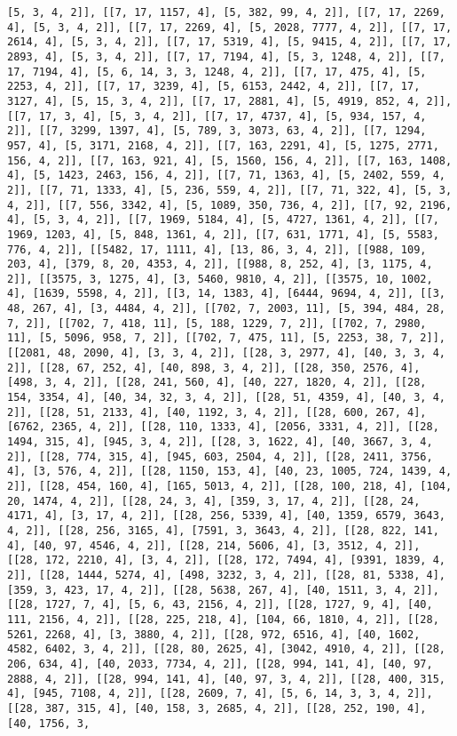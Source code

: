 \documentclass[12pt,fleqn]{article}\usepackage{../../common}
\begin{document}
\begin{verbatim}
[5, 3, 4, 2]], [[7, 17, 1157, 4], [5, 382, 99, 4, 2]], [[7, 17, 2269, 4], [5, 3, 4, 2]], [[7, 17, 2269, 4], [5, 2028, 7777, 4, 2]], [[7, 17, 2614, 4], [5, 3, 4, 2]], [[7, 17, 5319, 4], [5, 9415, 4, 2]], [[7, 17, 2893, 4], [5, 3, 4, 2]], [[7, 17, 7194, 4], [5, 3, 1248, 4, 2]], [[7, 17, 7194, 4], [5, 6, 14, 3, 3, 1248, 4, 2]], [[7, 17, 475, 4], [5, 2253, 4, 2]], [[7, 17, 3239, 4], [5, 6153, 2442, 4, 2]], [[7, 17, 3127, 4], [5, 15, 3, 4, 2]], [[7, 17, 2881, 4], [5, 4919, 852, 4, 2]], [[7, 17, 3, 4], [5, 3, 4, 2]], [[7, 17, 4737, 4], [5, 934, 157, 4, 2]], [[7, 3299, 1397, 4], [5, 789, 3, 3073, 63, 4, 2]], [[7, 1294, 957, 4], [5, 3171, 2168, 4, 2]], [[7, 163, 2291, 4], [5, 1275, 2771, 156, 4, 2]], [[7, 163, 921, 4], [5, 1560, 156, 4, 2]], [[7, 163, 1408, 4], [5, 1423, 2463, 156, 4, 2]], [[7, 71, 1363, 4], [5, 2402, 559, 4, 2]], [[7, 71, 1333, 4], [5, 236, 559, 4, 2]], [[7, 71, 322, 4], [5, 3, 4, 2]], [[7, 556, 3342, 4], [5, 1089, 350, 736, 4, 2]], [[7, 92, 2196, 4], [5, 3, 4, 2]], [[7, 1969, 5184, 4], [5, 4727, 1361, 4, 2]], [[7, 1969, 1203, 4], [5, 848, 1361, 4, 2]], [[7, 631, 1771, 4], [5, 5583, 776, 4, 2]], [[5482, 17, 1111, 4], [13, 86, 3, 4, 2]], [[988, 109, 203, 4], [379, 8, 20, 4353, 4, 2]], [[988, 8, 252, 4], [3, 1175, 4, 2]], [[3575, 3, 1275, 4], [3, 5460, 9810, 4, 2]], [[3575, 10, 1002, 4], [1639, 5598, 4, 2]], [[3, 14, 1383, 4], [6444, 9694, 4, 2]], [[3, 48, 267, 4], [3, 4484, 4, 2]], [[702, 7, 2003, 11], [5, 394, 484, 28, 7, 2]], [[702, 7, 418, 11], [5, 188, 1229, 7, 2]], [[702, 7, 2980, 11], [5, 5096, 958, 7, 2]], [[702, 7, 475, 11], [5, 2253, 38, 7, 2]], [[2081, 48, 2090, 4], [3, 3, 4, 2]], [[28, 3, 2977, 4], [40, 3, 3, 4, 2]], [[28, 67, 252, 4], [40, 898, 3, 4, 2]], [[28, 350, 2576, 4], [498, 3, 4, 2]], [[28, 241, 560, 4], [40, 227, 1820, 4, 2]], [[28, 154, 3354, 4], [40, 34, 32, 3, 4, 2]], [[28, 51, 4359, 4], [40, 3, 4, 2]], [[28, 51, 2133, 4], [40, 1192, 3, 4, 2]], [[28, 600, 267, 4], [6762, 2365, 4, 2]], [[28, 110, 1333, 4], [2056, 3331, 4, 2]], [[28, 1494, 315, 4], [945, 3, 4, 2]], [[28, 3, 1622, 4], [40, 3667, 3, 4, 2]], [[28, 774, 315, 4], [945, 603, 2504, 4, 2]], [[28, 2411, 3756, 4], [3, 576, 4, 2]], [[28, 1150, 153, 4], [40, 23, 1005, 724, 1439, 4, 2]], [[28, 454, 160, 4], [165, 5013, 4, 2]], [[28, 100, 218, 4], [104, 20, 1474, 4, 2]], [[28, 24, 3, 4], [359, 3, 17, 4, 2]], [[28, 24, 4171, 4], [3, 17, 4, 2]], [[28, 256, 5339, 4], [40, 1359, 6579, 3643, 4, 2]], [[28, 256, 3165, 4], [7591, 3, 3643, 4, 2]], [[28, 822, 141, 4], [40, 97, 4546, 4, 2]], [[28, 214, 5606, 4], [3, 3512, 4, 2]], [[28, 172, 2210, 4], [3, 4, 2]], [[28, 172, 7494, 4], [9391, 1839, 4, 2]], [[28, 1444, 5274, 4], [498, 3232, 3, 4, 2]], [[28, 81, 5338, 4], [359, 3, 423, 17, 4, 2]], [[28, 5638, 267, 4], [40, 1511, 3, 4, 2]], [[28, 1727, 7, 4], [5, 6, 43, 2156, 4, 2]], [[28, 1727, 9, 4], [40, 111, 2156, 4, 2]], [[28, 225, 218, 4], [104, 66, 1810, 4, 2]], [[28, 5261, 2268, 4], [3, 3880, 4, 2]], [[28, 972, 6516, 4], [40, 1602, 4582, 6402, 3, 4, 2]], [[28, 80, 2625, 4], [3042, 4910, 4, 2]], [[28, 206, 634, 4], [40, 2033, 7734, 4, 2]], [[28, 994, 141, 4], [40, 97, 2888, 4, 2]], [[28, 994, 141, 4], [40, 97, 3, 4, 2]], [[28, 400, 315, 4], [945, 7108, 4, 2]], [[28, 2609, 7, 4], [5, 6, 14, 3, 3, 4, 2]], [[28, 387, 315, 4], [40, 158, 3, 2685, 4, 2]], [[28, 252, 190, 4], [40, 1756, 3, 
\end{verbatim}
\end{document}
